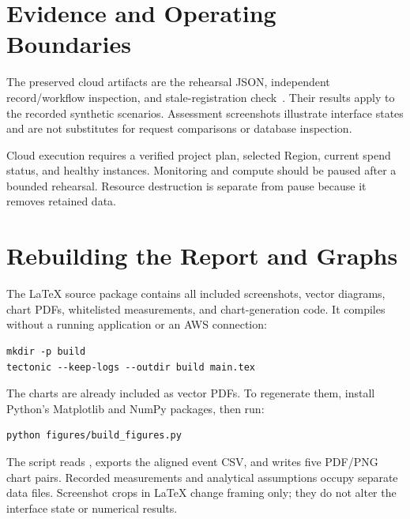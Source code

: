 \section{Evidence and Operating Boundaries}
The preserved cloud artifacts are the rehearsal JSON, independent record/workflow inspection, and stale-registration check~\cite{cloud-run,cloud-records,cloud-stale}. Their results apply to the recorded synthetic scenarios. Assessment screenshots illustrate interface states and are not substitutes for request comparisons or database inspection.

Cloud execution requires a verified project plan, selected Region, current spend status, and healthy instances. Monitoring and compute should be paused after a bounded rehearsal. Resource destruction is separate from pause because it removes retained data.
\section{Rebuilding the Report and Graphs}
The LaTeX source package contains all included screenshots, vector diagrams, chart PDFs, whitelisted measurements, and chart-generation code. It compiles without a running application or an AWS connection:
\begin{lstlisting}
mkdir -p build
tectonic --keep-logs --outdir build main.tex
\end{lstlisting}
The charts are already included as vector PDFs. To regenerate them, install Python's Matplotlib and NumPy packages, then run:
\begin{lstlisting}
python figures/build_figures.py
\end{lstlisting}
The script reads , exports the aligned event CSV, and writes five PDF/PNG chart pairs. Recorded measurements and analytical assumptions occupy separate data files. Screenshot crops in LaTeX change framing only; they do not alter the interface state or numerical results.
